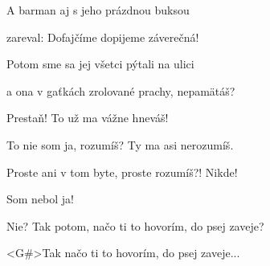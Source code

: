 \zs
A barman aj s jeho prázdnou buksou 

zareval: Dofajčíme dopijeme záverečná! 

Potom sme sa jej všetci pýtali na ulici 

a ona v gaťkách zrolované prachy, nepamätáš? 
\ks

\zs
Prestaň! To už ma vážne hneváš! 

To nie som ja, rozumíš? Ty ma asi nerozumíš. 

Proste ani v tom byte, proste rozumíš?! Nikde! 

Som nebol ja! 
\ks

Nie? Tak potom, načo ti to hovorím, do psej zaveje? 

\zr
<G#>Tak načo ti to hovorím, do psej zaveje...
\kr

\kp

